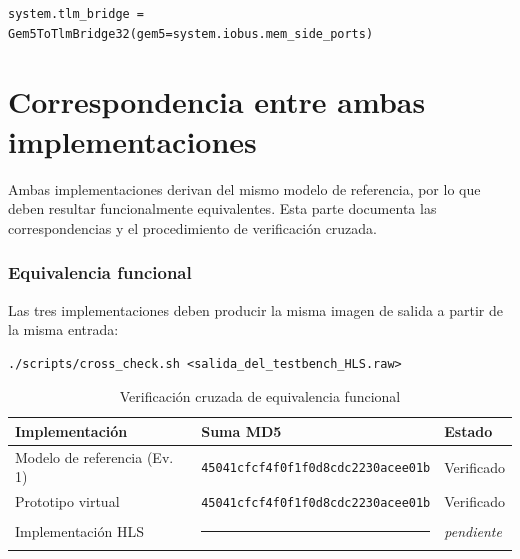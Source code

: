 \documentclass[11pt,letterpaper]{article}
\begin{document}
\begin{lstlisting}[style=pystyle]
system.tlm_bridge = Gem5ToTlmBridge32(gem5=system.iobus.mem_side_ports)
\end{lstlisting}

\newpage
\part{Correspondencia entre ambas implementaciones}
\label{part:correspondencia}

Ambas implementaciones derivan del mismo modelo de referencia, por lo que deben
resultar funcionalmente equivalentes. Esta parte documenta las correspondencias
y el procedimiento de verificación cruzada.

\section{Equivalencia funcional}
\label{sec:bitexact}

Las tres implementaciones deben producir la misma imagen de salida a partir de
la misma entrada:

\begin{lstlisting}[style=shstyle,caption={Verificacion cruzada de las tres salidas.}]
./scripts/cross_check.sh <salida_del_testbench_HLS.raw>
\end{lstlisting}

\begin{table}[H]
\centering
\caption{Verificación cruzada de equivalencia funcional}
\label{tab:bitexact}
\begin{tabular}{@{}lll@{}}
\toprule
\textbf{Implementación} & \textbf{Suma MD5} & \textbf{Estado} \\
\midrule
Modelo de referencia (Ev. 1) & \texttt{45041cfcf4f0f1f0d8cdc2230acee01b} &
  \textcolor{verdeok}{Verificado} \\
Prototipo virtual            & \texttt{45041cfcf4f0f1f0d8cdc2230acee01b} &
  \textcolor{verdeok}{Verificado} \\
Implementación HLS           & \rule{5cm}{0.4pt} & \emph{pendiente} \\
\bottomrule
\end{tabular}
\end{table}
\end{document}
